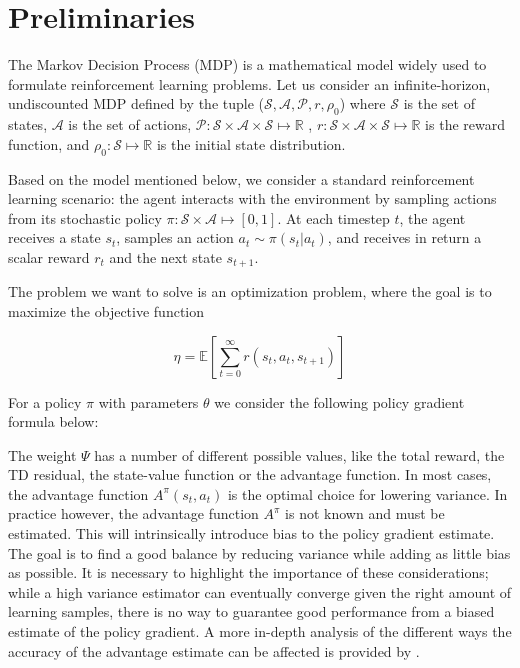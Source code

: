 \section{Preliminaries}
\label{sec:preleminaries}

The Markov Decision Process (MDP) is a mathematical model widely used to formulate reinforcement learning problems. Let us consider an infinite-horizon, undiscounted MDP defined by the tuple ($\mathcal{S}, \mathcal{A}, \mathcal{P}, r, \rho_0$) where $\mathcal{S}$ is the set of states, $\mathcal{A}$ is the set of actions, $\mathcal{P}: \mathcal{S}\times\mathcal{A}\times\mathcal{S}\mapsto \mathbb{R}$ , $r: \mathcal{S}\times\mathcal{A}\times\mathcal{S} \mapsto \mathbb{R}$ is the reward function, and $\rho_0:\mathcal{S}\mapsto\mathbb{R}$ is the initial state distribution.

Based on the model mentioned below, we consider a standard reinforcement learning scenario: the agent interacts with the environment by sampling actions from its stochastic policy $\pi:\mathcal{S}\times\mathcal{A}\mapsto[0,1]$. At each timestep $t$, the agent receives a state $s_t$, samples an action $a_t \sim \pi(s_t | a_t)$, and receives in return a scalar reward $r_t$ and the next state $s_{t+1}$. 

The problem we want to solve is an optimization problem, where the goal is to maximize the objective function 

\[
\eta = \mathbb{E}
\left[ \sum_{t=0}^{\infty}r(s_t, a_t, s_{t+1})\right]
\] 



For a policy $\pi$ with parameters $\theta$ we consider the following policy gradient 
formula below:

The weight $\Psi$ has a number of different possible values, like the total reward, the TD residual, the state-value function or the advantage function. In most cases, the advantage function $A^\pi(s_t, a_t)$ is the optimal choice for lowering variance. 
In practice however, the advantage function $A^\pi$ is not known and must be estimated. This will intrinsically introduce bias to the policy gradient estimate. The goal is to find a good balance by reducing variance while adding as little bias as possible. It is necessary to highlight the importance of these considerations; while a high variance estimator can eventually converge given the right amount of learning samples, there is no way to guarantee good performance from a biased estimate of the policy gradient. 
A more in-depth analysis of the different ways the accuracy of the advantage estimate can be affected is provided by \cite{schulman2015highdimensional}. 

